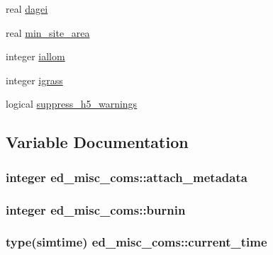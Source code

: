 \begin{DoxyCompactItemize}
\item 
real \hyperlink{namespaceed__misc__coms_a6dedccb6bd1fa55c04ad14eee4ddb95e}{dagei}
\item 
real \hyperlink{namespaceed__misc__coms_ab0d2bac6650ffb4e0fefdb6380ae1c38}{min\+\_\+site\+\_\+area}
\item 
integer \hyperlink{namespaceed__misc__coms_a63c098b4f6d8333d0ce468bc75088832}{iallom}
\item 
integer \hyperlink{namespaceed__misc__coms_a6494bf5748198e80e5a1af43ec3f497f}{igrass}
\item 
logical \hyperlink{namespaceed__misc__coms_ac658bfc9ea442f9905a0a857e1a82f96}{suppress\+\_\+h5\+\_\+warnings}
\end{DoxyCompactItemize}


\subsection{Variable Documentation}
\hypertarget{namespaceed__misc__coms_afb7de717ec53503d518604da7c021e1a}{}
\subsubsection[{attach\+\_\+metadata}]{\setlength{\rightskip}{0pt plus 5cm}integer ed\+\_\+misc\+\_\+coms\+::attach\+\_\+metadata}\label{namespaceed__misc__coms_afb7de717ec53503d518604da7c021e1a}
\hypertarget{namespaceed__misc__coms_a9b554bb456be251df521579a073ec34d}{}
\subsubsection[{burnin}]{\setlength{\rightskip}{0pt plus 5cm}integer ed\+\_\+misc\+\_\+coms\+::burnin}\label{namespaceed__misc__coms_a9b554bb456be251df521579a073ec34d}
\hypertarget{namespaceed__misc__coms_a74892b22b952f148c3ba1bfb0f150692}{}
\subsubsection[{current\+\_\+time}]{\setlength{\rightskip}{0pt plus 5cm}type({\bf simtime}) ed\+\_\+misc\+\_\+coms\+::current\+\_\+time}\label{namespaceed__misc__coms_a74892b22b952f148c3ba1bfb0f150692}
\hypertarget{namespaceed__misc__coms_a6dedccb6bd1fa55c04ad14eee4ddb95e}{}
